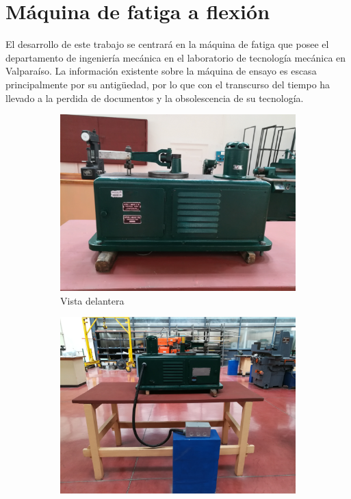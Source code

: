 \section{Máquina de fatiga a flexión}
El desarrollo de este trabajo se centrará en la máquina de fatiga que posee el departamento de ingeniería mecánica en el laboratorio de tecnología mecánica en Valparaíso. La información existente sobre la máquina de ensayo es escasa principalmente por su antigüedad, por lo que con el transcurso del tiempo ha llevado a la perdida de documentos y la obsolescencia de su tecnología.  

\begin{figure}[h]
\centering
	\begin{subfigure}{0.49\linewidth}
		\centering	
		\includegraphics[width=1\linewidth]{Imagenes/maq_del.jpg}
		\caption{Vista delantera}\label{fig:maq_del}
	\end{subfigure}
	\begin{subfigure}{0.49\linewidth}
		\centering		
		\includegraphics[width=1\linewidth]{Imagenes/maqfull_post.jpg}

\end{subfigure}
\end{figure}
